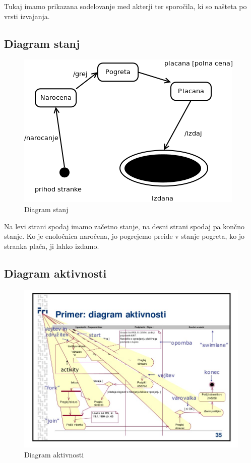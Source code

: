\documentclass[12pt]{article}
\begin{document}
Tukaj imamo prikazana sodelovanje med akterji ter sporočila, ki so našteta po vrsti izvajanja.

\newpage

\subsection{Diagram stanj}

\begin{figure}[htb]
\begin{center}
\includegraphics[scale=0.5]{stanj.png}
\end{center}
\caption{Diagram stanj}
\label{stanj}
\end{figure}

Na levi strani spodaj imamo začetno stanje, na desni strani spodaj pa končno stanje. Ko je enoločnica naročena,
jo pogrejemo preide v stanje pogreta, ko jo stranka plača, ji lahko izdamo.



\newpage

\subsection{Diagram aktivnosti}

\begin{figure}[htb]
\begin{center}
\includegraphics[scale=0.5]{aktivnosti.jpeg}
\end{center}
\caption{Diagram aktivnosti}
\label{aktivnosti}
\end{figure}
\end{document}

